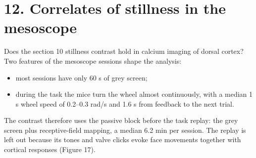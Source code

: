 \documentclass[10pt,a4paper]{article}
\begin{document}
\section{12. Correlates of stillness in the mesoscope}
Does the section 10 stillness contrast hold in calcium imaging of dorsal cortex? Two features of the mesoscope sessions shape the analysis:

\begin{itemize}
\item most sessions have only 60 s of grey screen;
\item during the task the mice turn the wheel almost continuously, with a median 1 s wheel speed of 0.2--0.3 rad/s and 1.6 s from feedback to the next trial.
\end{itemize}
The contrast therefore uses the passive block before the task replay: the grey screen plus receptive-field mapping, a median 6.2 min per session. The replay is left out because its tones and valve clicks evoke face movements together with cortical responses (Figure 17).
\end{document}
